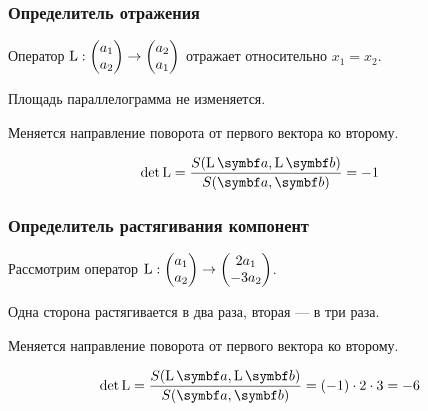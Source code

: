 \begin{frame}
\begin{center}
\begin{tikzpicture}[
scale=1.8,
MyPoints/.style={draw=blue,fill=white,thick},
Segments/.style={draw=blue!50!red!70,thick},
MyCircles/.style={green!50!blue!50,thin}, 
every node/.style={scale=1}
]



\end{tikzpicture}



    \end{center}

\end{frame}


\begin{frame}
\frametitle{Определитель отражения}
    

Оператор $\LL : \begin{pmatrix}
  a_1 \\
  a_2 \\
\end{pmatrix} \to 
\begin{pmatrix}
  a_2 \\
  a_1 \\
\end{pmatrix}$ отражает относительно $x_1= x_2$.


\pause



    Площадь параллелограмма не изменяется. 


    Меняется направление поворота от первого вектора ко второму. 

    \pause

    \[
    \det \LL = \frac{S(\LL \ba, \LL \bb )}{S(\ba, \bb )} = -1
    \]

\end{frame}






\begin{frame}
    \frametitle{Определитель растягивания компонент}


    Рассмотрим оператор $\LL : \begin{pmatrix}
      a_1 \\
      a_2 \\
    \end{pmatrix} \to 
    \begin{pmatrix}
      2a_1 \\
      -3a_2 \\
    \end{pmatrix}$.
    

    \pause

    Одна сторона растягивается в два раза, вторая — в три раза.


    Меняется направление поворота от первого вектора ко второму. 

    \pause

    \[
    \det \LL = \frac{S(\LL \ba, \LL \bb )}{S(\ba, \bb )} = (-1)\cdot 2\cdot 3 = -6
    \]

\end{frame}




